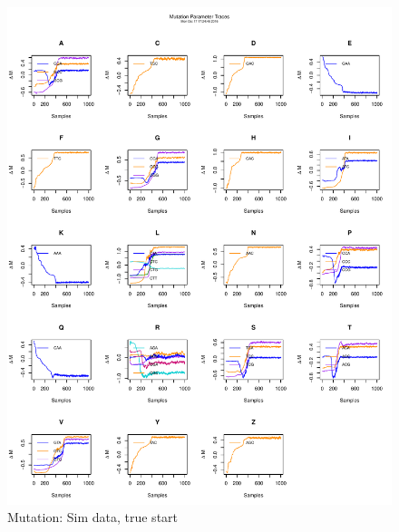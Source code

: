 \documentclass[11pt]{labbook}
\begin{document}
    \begin{figure}
        \centering
        \includegraphics[scale=.65]{FONSE_Plots/2016/October_17/simulated_true_mut}
        \caption{Mutation: Sim data, true start}
        \label{fig:OCT17_S.T.MUT}
    \end{figure}
\end{document}
